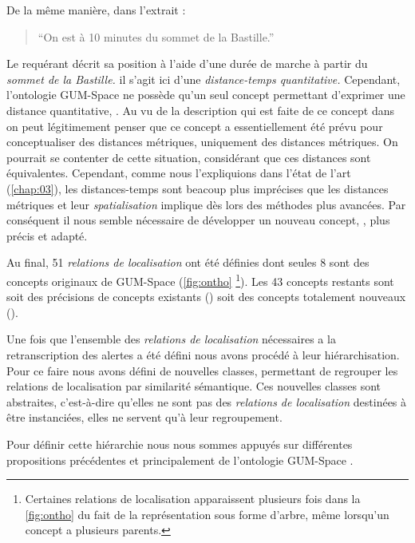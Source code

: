 De la même manière, dans l'extrait :
%
\begin{quote}
  \begin{dialogue}
    \Req \enquote{On est à 10 minutes du sommet de la Bastille.}
  \end{dialogue}
\end{quote}
%
Le requérant décrit sa position à l'aide d'une durée de marche à
partir du \emph{sommet de la Bastille.} il s'agit ici d'une
\emph{distance-temps quantitative.} Cependant, l'ontologie GUM-Space
ne possède qu'un seul concept permettant d'exprimer une distance
quantitative, . Au vu de la
description qui est faite de ce concept dans \textcite{Bateman2010} on
peut légitimement penser que ce concept a essentiellement été prévu
pour conceptualiser des distances métriques, uniquement des distances
métriques. On pourrait se contenter de cette situation, considérant
que ces distances sont équivalentes. Cependant, comme nous
l'expliquions dans l'état de l'art (\autoref{chap:03}), les
distances-temps sont beacoup plus imprécises que les distances
métriques et leur \emph{spatialisation} implique dès lors des méthodes
plus avancées. Par conséquent il nous semble nécessaire de développer
un nouveau concept, , plus précis et
adapté.

Au final, 51 \emph{relations de localisation} ont été définies dont
seules 8 sont des concepts originaux de GUM-Space (\autoref{fig:ontho}
\footnote{Certaines relations de localisation apparaissent plusieurs
  fois dans la \autoref{fig:ontho} du fait de la représentation sous
  forme d'arbre, même lorsqu'un concept a plusieurs parents. }). Les
43 concepts restants sont soit des précisions de concepts existants
(\eg {}) soit des concepts totalement
nouveaux (\eg {}).

Une fois que l'ensemble des \emph{relations de localisation}
nécessaires a la retranscription des alertes a été défini nous avons
procédé à leur hiérarchisation. Pour ce faire nous avons défini de
nouvelles classes, permettant de regrouper les relations de
localisation par similarité sémantique. Ces nouvelles classes sont
abstraites, c'est-à-dire qu'elles ne sont pas des \emph{relations de
  localisation} destinées à être instanciées, elles ne servent qu'à
leur regroupement.

Pour définir cette hiérarchie nous nous sommes appuyés sur différentes
propositions précédentes et principalement de l'ontologie GUM-Space
\autocite{Bateman2010}.

